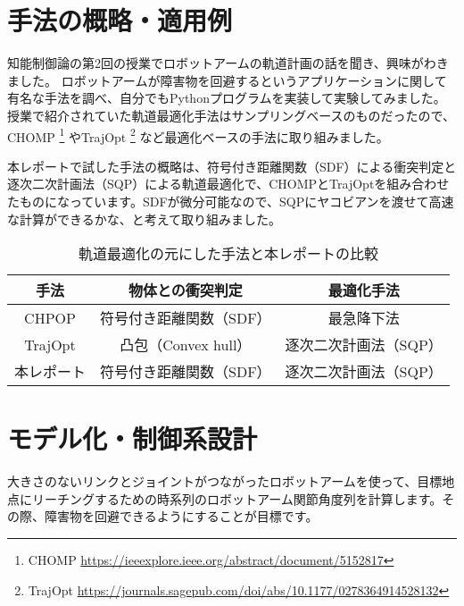 
\section{手法の概略・適用例}

知能制御論の第2回の授業でロボットアームの軌道計画の話を聞き、興味がわきました。
ロボットアームが障害物を回避するというアプリケーションに関して有名な手法を調べ、自分でもPythonプログラムを実装して実験してみました。授業で紹介されていた軌道最適化手法はサンプリングベースのものだったので、CHOMP
\footnote{CHOMP \url{https://ieeexplore.ieee.org/abstract/document/5152817}}
やTrajOpt
\footnote{TrajOpt \url{https://journals.sagepub.com/doi/abs/10.1177/0278364914528132}}
など最適化ベースの手法に取り組みました。

本レポートで試した手法の概略は、符号付き距離関数（SDF）による衝突判定と逐次二次計画法（SQP）による軌道最適化で、CHOMPとTrajOptを組み合わせたものになっています。SDFが微分可能なので、SQPにヤコビアンを渡せて高速な計算ができるかな、と考えて取り組みました。

\begin{table}[htbp]
  \centering
  \begin{tabular}{c||c|c}
    手法 & 物体との衝突判定 & 最適化手法                         \\ \hline
    CHPOP      & 符号付き距離関数（SDF） & 最急降下法            \\
    TrajOpt    & 凸包（Convex hull）     & 逐次二次計画法（SQP） \\
    本レポート & 符号付き距離関数（SDF） & 逐次二次計画法（SQP） \\
  \end{tabular}
  \caption{軌道最適化の元にした手法と本レポートの比較}
  \label{table:compare}
\end{table}

\section{モデル化・制御系設計}
大きさのないリンクとジョイントがつながったロボットアームを使って、目標地点にリーチングするための時系列のロボットアーム関節角度列を計算します。その際、障害物を回避できるようにすることが目標です。

